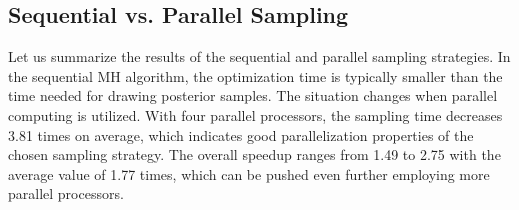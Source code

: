 \subsection{Sequential vs. Parallel Sampling}
Let us summarize the results of the sequential and parallel sampling strategies.
In the sequential MH algorithm, the optimization time is typically smaller than the time needed for drawing posterior samples.
The situation changes when parallel computing is utilized. With four parallel processors, the sampling time decreases 3.81 times on average, which indicates good parallelization properties of the chosen sampling strategy.
The overall speedup ranges from 1.49 to 2.75 with the average value of 1.77 times, which can be pushed even further employing more parallel processors.
